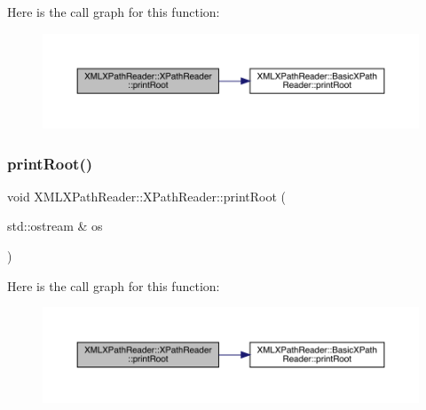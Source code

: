 Here is the call graph for this function\+:
\nopagebreak
\begin{figure}[H]
\begin{center}
\leavevmode
\includegraphics[width=350pt]{d3/d5a/classXMLXPathReader_1_1XPathReader_a9634a8955fc1b2c8bc086b95f7fa2c1f_cgraph}
\end{center}
\end{figure}
\mbox{\label{classXMLXPathReader_1_1XPathReader_a9634a8955fc1b2c8bc086b95f7fa2c1f}} 
\subsubsection{\texorpdfstring{printRoot()}{printRoot()}\hspace{0.1cm}{\footnotesize\ttfamily [3/3]}}
{\footnotesize\ttfamily void X\+M\+L\+X\+Path\+Reader\+::\+X\+Path\+Reader\+::print\+Root (\begin{DoxyParamCaption}\item[{std\+::ostream \&}]{os }\end{DoxyParamCaption})\hspace{0.3cm}{\ttfamily [inline]}}

Here is the call graph for this function\+:
\nopagebreak
\begin{figure}[H]
\begin{center}
\leavevmode
\includegraphics[width=350pt]{d3/d5a/classXMLXPathReader_1_1XPathReader_a9634a8955fc1b2c8bc086b95f7fa2c1f_cgraph}
\end{center}
\end{figure}
\mbox{\label{classXMLXPathReader_1_1XPathReader_a8f751fb071319179252a48075239559c}} 
